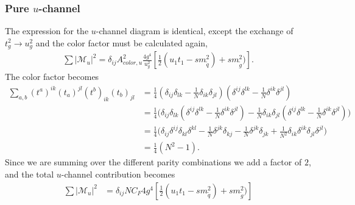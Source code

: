 \documentclass[11pt]{article}
\begin{document}
\subsubsection*{Pure $u$-channel}
\begin{flushleft}
The expression for the $u$-channel diagram is identical, except the exchange of $t_g^2 \rightarrow u_g^2$ and the color factor must be calculated again,
\begin{align*}
\sum |\mathcal{M}_u|^2 = \delta_{ij} A^2_{color, u} \frac{4 g^4}{u_g^2} [\frac{1}{2}( u_1 t_1 - sm_{\tilde{q}}^2) +s m_{\tilde{g}}^2)]. 
\end{align*}
The color factor becomes
\begin{align*}
\sum_{a,b}(t^a)^{ik}(t_a)^{jl}(t^b)_{ik}(t_b)_{jl} &= \frac{1}{4}(\delta_{ij}\delta_{lk}-\frac{1}{N}\delta_{ik}\delta_{jl})(\delta^{ij}\delta^{lk}-\frac{1}{N}\delta^{ik}\delta^{jl})\\
&= \frac{1}{4} \big(\delta_{ij}\delta_{lk}(\delta^{ij}\delta^{lk}-\frac{1}{N}\delta^{ik}\delta^{jl}) -\frac{1}{N}\delta_{ik}\delta_{jl}(\delta^{ij}\delta^{lk}-\frac{1}{N}\delta^{ik}\delta^{jl}) \big)\\
&= \frac{1}{4} \big(\delta_{ij}\delta^{ij} \delta_{kl} \delta^{kl} - \frac{1}{N} \delta^{jk}\delta_{kj} - \frac{1}{N} \delta^{jk}\delta_{jk} + \frac{1}{N^2} \delta_{ik} \delta^{ik} \delta_{jl} \delta^{jl} \big)\\
&= \frac{1}{4} (N^2-1).
\end{align*}
Since we are summing over the different parity combinations we add a factor of $2$, and the total $u$-channel contribution becomes
\begin{align*}
\sum |\mathcal{M}_u|^2 &= \delta_{ij} NC_F 4g^4 [\frac{1}{2}( u_1 t_1 - sm_{\tilde{q}}^2) +s m_{\tilde{g}}^2)]
\end{align*}
\end{flushleft}
\end{document}
